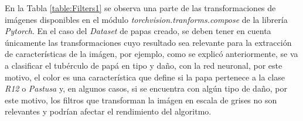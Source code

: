 En la Tabla \ref{table:Filters1} se observa una parte de las transformaciones de imágenes disponibles en el módulo \textit{torchvision.tranforms.compose} de la librería \textit{Pytorch}. En el caso del \textit{Dataset} de papas creado, se deben tener en cuenta únicamente las transformaciones cuyo resultado sea relevante para la extracción de características de la imágen, por ejemplo, como se explicó anteriormente, se va a clasificar el tubérculo de papá en tipo y daño, con la red neuronal, por este motivo, el color es una característica que define si la papa pertenece a la clase \textit{R12} o \textit{Pastusa} y, en algunos casos, si se encuentra con algún tipo de daño, por este motivo, los filtros que transforman la imágen en escala de grises no son relevantes y podrían afectar el rendimiento del algoritmo.

\newpage

\vspace{1cm}


